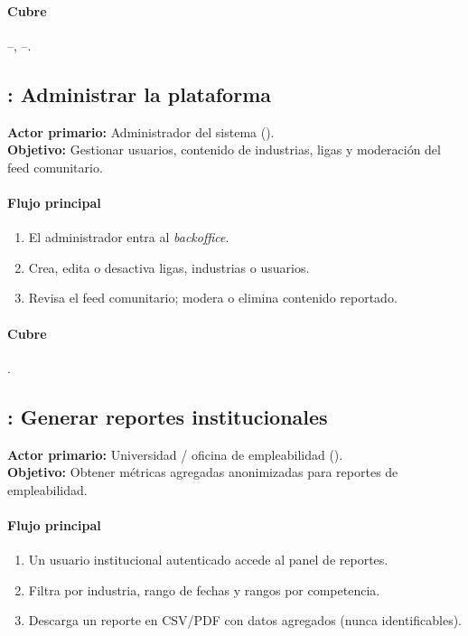 \paragraph{Cubre} --, --.

\subsection{: Administrar la plataforma}
\begin{cajaCriterio}
\textbf{Actor primario:} Administrador del sistema (). \\
\textbf{Objetivo:} Gestionar usuarios, contenido de industrias, ligas y
moderación del feed comunitario.
\end{cajaCriterio}

\paragraph{Flujo principal}
\begin{enumerate}
  \item El administrador entra al \textit{backoffice}.
  \item Crea, edita o desactiva ligas, industrias o usuarios.
  \item Revisa el feed comunitario; modera o elimina contenido reportado.
\end{enumerate}

\paragraph{Cubre} .

\subsection{: Generar reportes institucionales}
\begin{cajaCriterio}
\textbf{Actor primario:} Universidad / oficina de empleabilidad (). \\
\textbf{Objetivo:} Obtener métricas agregadas anonimizadas para reportes
de empleabilidad.
\end{cajaCriterio}

\paragraph{Flujo principal}
\begin{enumerate}
  \item Un usuario institucional autenticado accede al panel de reportes.
  \item Filtra por industria, rango de fechas y rangos por competencia.
  \item Descarga un reporte en CSV/PDF con datos agregados (nunca
        identificables).
\end{enumerate}

